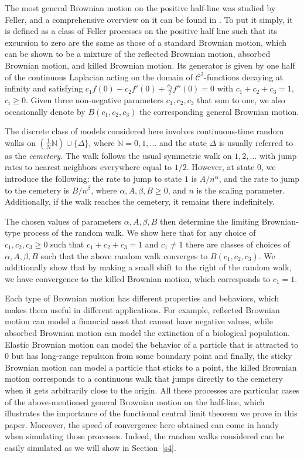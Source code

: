 \documentclass[12pt,a4paper]{article}
\theoremstyle{plain}
\theoremstyle{remark}
\newcommand{\mc}[1]{{\mathcal #1}}
\begin{document}
	
	
	The most general Brownian motion on the positive half-line was studied by Feller, and a comprehensive overview on it can be found in \citet[Theorem~6.2, p.\ 157]{Knight}. To put it simply, it is defined as a class of Feller processes on the positive half line such that its excursion to zero are the same as those of a standard Brownian motion, which can be shown to be a mixture of the reflected Brownian motion,  absorbed Brownian motion, and killed Brownian motion. Its generator is given by one half of the continuous Laplacian acting on the domain of $\mc C^2$-functions decaying at infinity and satisfying $c_1 f(0)-c_2 f'(0)+\frac{c_3}{2}f''(0)=0$ with $c_1+c_2+c_3=1$,  $c_i\geq 0$. Given three non-negative parameters $c_1, c_2, c_3$ that sum to one, we also occasionally denote by $B(c_1, c_2,c_3)$ the corresponding general Brownian motion.
	
	
	
	
	
	The discrete class of models considered here involves continuous-time random walks on $(\frac{1}{N}\mathbb{N})\cup\{\Delta\}$, where $\mathbb{N}={0,1,\ldots}$ and the state $\Delta$ is usually referred to as the \textit{cemetery}. The walk follows the usual symmetric walk on ${1,2,\ldots}$ with jump rates to nearest neighbors everywhere equal to $1/2$. However, at state $0$, we introduce the following: the rate to jump to state $1$ is $A/n^\alpha$, and the rate to jump to the cemetery is $B/n^\beta$, where $\alpha, A, \beta, B\geq 0$, and $n$ is the scaling parameter. Additionally, if the walk reaches the cemetery, it remains there indefinitely.
	
	The chosen values of parameters $\alpha, A, \beta, B$ then determine the limiting Brownian-type process of the random walk.
	We show here that for any choice of $c_1, c_2, c_3\geq 0$ such that $c_1+c_2+c_3=1$ and $c_1\neq 1$ there are classes of choices of $\alpha, A, \beta, B$ such that the above random walk converges to $B(c_1, c_2, c_3)$. We additionally show that by making a small shift to the right of the random walk,  we have convergence to the killed Brownian motion, which corresponds to  $c_1=1$.
	
	Each type of Brownian motion has different properties and behaviors, which makes them useful in different applications. For example, reflected Brownian motion can model a financial asset that cannot have negative values, while absorbed Brownian motion can model the extinction of a biological population. Elastic Brownian motion can model the behavior of a particle that is attracted to $0$ but has long-range repulsion from some boundary point and finally, the sticky Brownian motion can model a particle that sticks to a point, the killed Brownian motion corresponds to a continuous walk that jumps directly to the cemetery when it gets arbitrarily close to the origin. All these processes are particular cases of the above-mentioned general Brownian motion on the half-line, which illustrates the importance of the functional central limit theorem we prove in this paper. Moreover, the speed of convergence here obtained can come in handy when simulating those processes. Indeed, the random walks considered can be easily simulated as we will show in Section~\ref{s4}.
	
\end{document}
